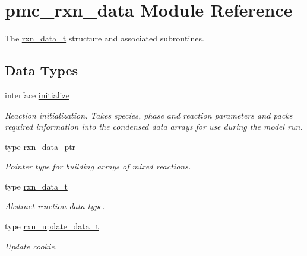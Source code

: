\hypertarget{namespacepmc__rxn__data}{}\section{pmc\+\_\+rxn\+\_\+data Module Reference}
\label{namespacepmc__rxn__data}


The \mbox{\hyperlink{structpmc__rxn__data_1_1rxn__data__t}{rxn\+\_\+data\+\_\+t}} structure and associated subroutines.  


\subsection*{Data Types}
\begin{DoxyCompactItemize}
\item 
interface \mbox{\hyperlink{interfacepmc__rxn__data_1_1initialize}{initialize}}
\begin{DoxyCompactList}\small\item\em Reaction initialization. Takes species, phase and reaction parameters and packs required information into the condensed data arrays for use during the model run. \end{DoxyCompactList}\item 
type \mbox{\hyperlink{structpmc__rxn__data_1_1rxn__data__ptr}{rxn\+\_\+data\+\_\+ptr}}
\begin{DoxyCompactList}\small\item\em Pointer type for building arrays of mixed reactions. \end{DoxyCompactList}\item 
type \mbox{\hyperlink{structpmc__rxn__data_1_1rxn__data__t}{rxn\+\_\+data\+\_\+t}}
\begin{DoxyCompactList}\small\item\em Abstract reaction data type. \end{DoxyCompactList}\item 
type \mbox{\hyperlink{structpmc__rxn__data_1_1rxn__update__data__t}{rxn\+\_\+update\+\_\+data\+\_\+t}}
\begin{DoxyCompactList}\small\item\em Update cookie. \end{DoxyCompactList}\end{DoxyCompactItemize}
